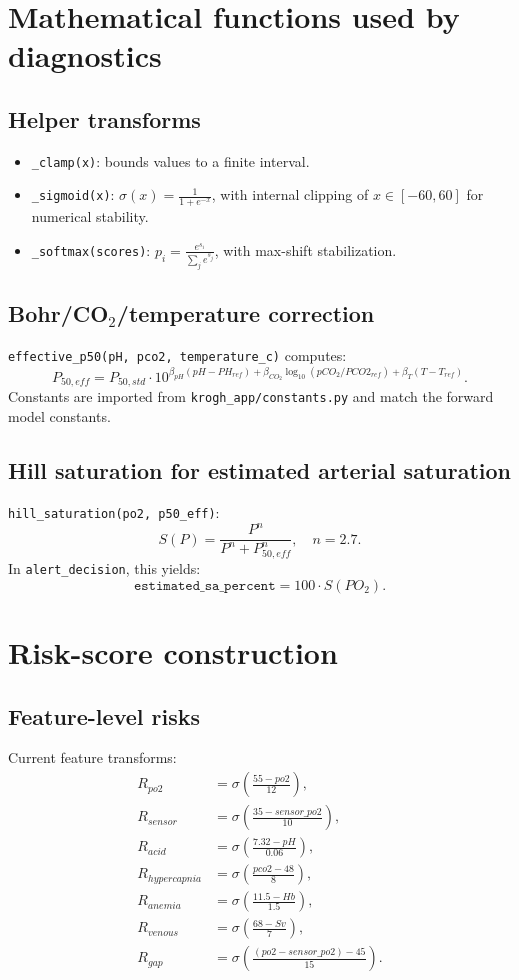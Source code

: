 \documentclass[12pt,a4paper]{article}
\begin{document}
\section{Mathematical functions used by diagnostics}
\subsection{Helper transforms}
\begin{itemize}
    \item \texttt{\_clamp(x)}: bounds values to a finite interval.
    \item \texttt{\_sigmoid(x)}: $\sigma(x)=\frac{1}{1+e^{-x}}$, with internal clipping of $x\in[-60,60]$ for numerical stability.
    \item \texttt{\_softmax(scores)}: $p_i=\frac{e^{s_i}}{\sum_j e^{s_j}}$, with max-shift stabilization.
\end{itemize}

\subsection{Bohr/CO$_2$/temperature correction}
\texttt{effective\_p50(pH, pco2, temperature\_c)} computes:
\[
P_{50,eff}=P_{50,std}\cdot10^{\beta_{pH}(pH-PH_{ref}) + \beta_{CO_2}\log_{10}(pCO_2/PCO2_{ref}) + \beta_T(T-T_{ref})}.
\]
Constants are imported from \texttt{krogh\_app/constants.py} and match the forward model constants.

\subsection{Hill saturation for estimated arterial saturation}
\texttt{hill\_saturation(po2, p50\_eff)}:
\[
S(P)=\frac{P^n}{P^n+P_{50,eff}^n},\quad n=2.7.
\]
In \texttt{alert\_decision}, this yields:
\[
\texttt{estimated\_sa\_percent}=100\cdot S(PO_2).
\]

\section{Risk-score construction}
\subsection{Feature-level risks}
Current feature transforms:
\begin{align*}
R_{po2} &= \sigma\left(\frac{55-po2}{12}\right), \\
R_{sensor} &= \sigma\left(\frac{35-sensor\_po2}{10}\right), \\
R_{acid} &= \sigma\left(\frac{7.32-pH}{0.06}\right), \\
R_{hypercapnia} &= \sigma\left(\frac{pco2-48}{8}\right), \\
R_{anemia} &= \sigma\left(\frac{11.5-Hb}{1.5}\right), \\
R_{venous} &= \sigma\left(\frac{68-Sv}{7}\right), \\
R_{gap} &= \sigma\left(\frac{(po2-sensor\_po2)-45}{15}\right).
\end{align*}
\end{document}
